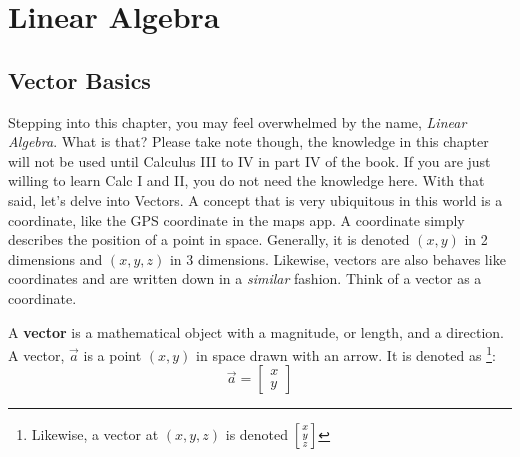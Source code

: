 \chapter{Linear Algebra}

\section{Vector Basics}

Stepping into this chapter, you may feel overwhelmed by the name, \textit{Linear Algebra}. What is that? Please take note though, the knowledge in this chapter will not be used until Calculus III to IV in part IV of the book. If you are just willing to learn Calc I and II, you do not need the knowledge here. With that said, let's delve into Vectors. A concept that is very ubiquitous in this world is a coordinate, like the GPS coordinate in the maps app. A coordinate simply describes the position of a point in space. Generally, it is denoted \((x,y)\) in 2 dimensions and \((x,y,z)\) in 3 dimensions. Likewise, vectors are also behaves like coordinates and are written down in a \textit{similar} fashion. Think of a vector as a coordinate.
\begin{definition}
  A \textbf{vector} is a mathematical object with a magnitude, or length, and a direction. A vector, \(\vec{a}\) is a point \((x,y)\) in space drawn with an arrow. It is denoted as \footnote{Likewise, a vector at \((x,y,z)\) is denoted \(
\begin{bsmallmatrix}
  x \\
  y \\
  z
\end{bsmallmatrix}
\)}:
  \begin{equation*}
    \vec{a} = \begin{bmatrix}
      x \\
      y
    \end{bmatrix} 
  \end{equation*}
\end{definition}


